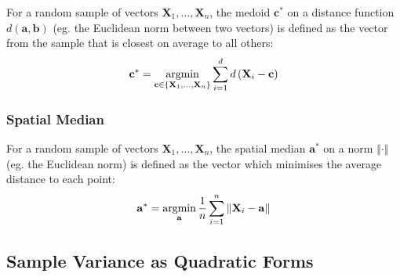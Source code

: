 \documentclass[11pt]{report} %
\begin{document}
For a random sample of vectors $\mathbf{X}_{1}, \dots, \mathbf{X}_{n}$, the medoid $\mathbf{c}^{*}$ on a distance function $d\left(\mathbf{a}, \mathbf{b}\right)$ (eg. the Euclidean norm between two vectors) is defined as the vector from the sample that is closest on average to all others:
\begin{equation}
\mathbf{c}^{*} = \operatorname*{argmin}_{\mathbf{c} \in \left\{\mathbf{X}_{1}, \dots, \mathbf{X}_{n}\right\}}\sum_{i = 1}^{d}d\left(\mathbf{X}_{i} - \mathbf{c}\right)
\end{equation}

\subsubsection{Spatial Median}

For a random sample of vectors $\mathbf{X}_{1}, \dots, \mathbf{X}_{n}$, the spatial median $\mathbf{a}^{*}$ on a norm $\left\Vert\cdot\right\Vert$ (eg. the Euclidean norm) is defined as the vector which minimises the average distance to each point:
\begin{equation}
\mathbf{a}^{*} = \operatorname*{argmin}_{\mathbf{a}} \dfrac{1}{n}\sum_{i = 1}^{n}\left\Vert \mathbf{X}_{i} - \mathbf{a}\right\Vert
\end{equation}

\subsection{Sample Variance as Quadratic Forms}
\end{document}
